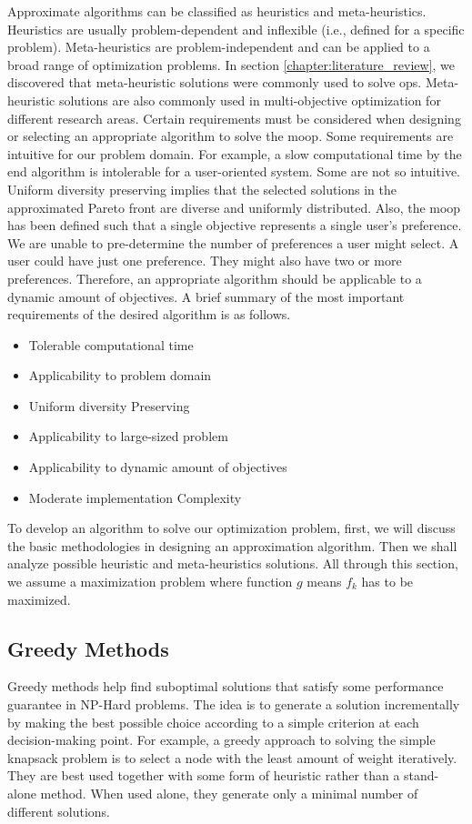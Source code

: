 Approximate algorithms can be classified as heuristics and meta-heuristics. Heuristics are usually problem-dependent and inflexible (i.e., defined for a specific problem). Meta-heuristics are problem-independent and can be applied to a broad range of optimization problems. In section \ref{chapter:literature_review}, we discovered that meta-heuristic solutions were commonly used to solve \glspl{op}. Meta-heuristic solutions are also commonly used in multi-objective optimization for different research areas. 
Certain requirements must be considered when designing or selecting an appropriate algorithm to solve the \gls{moop}. Some requirements are intuitive for our problem domain. For example, a slow computational time by the end algorithm is intolerable for a user-oriented system. Some are not so intuitive. Uniform diversity preserving implies that the selected solutions in the approximated Pareto front are diverse and uniformly distributed. Also, the \gls{moop} has been defined such that a single objective represents a single user's preference. We are unable to pre-determine the number of preferences a user might select. A user could have just one preference. They might also have two or more preferences. Therefore, an appropriate algorithm should be applicable to a dynamic amount of objectives. A brief summary of the most important requirements of the desired algorithm is as follows.
\begin{itemize}
    \item Tolerable computational time
    \item Applicability to problem domain
    \item Uniform diversity Preserving
    \item Applicability to large-sized problem
    \item Applicability to dynamic amount of objectives
    \item Moderate implementation Complexity
\end{itemize}



To develop an algorithm to solve our optimization problem, first, we will discuss the basic methodologies in designing an approximation algorithm. Then we shall analyze possible heuristic and meta-heuristics solutions. All through this section, we assume a maximization problem where function $g$ means $f_k$ has to be maximized.   

\subsection{Greedy Methods}
Greedy methods help find suboptimal solutions that satisfy some performance guarantee in NP-Hard problems. The idea is to generate a solution incrementally by making the best possible choice according to a simple criterion at each decision-making point. For example, a greedy approach to solving the simple knapsack problem is to select a node with the least amount of weight iteratively. They are best used together with some form of heuristic rather than a stand-alone method. When used alone, they generate only a minimal number of different solutions.


